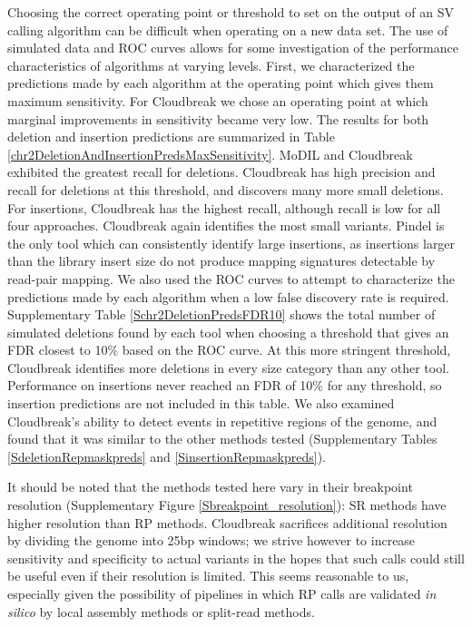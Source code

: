\documentclass[11pt]{article}
\begin{document}
Choosing the correct operating point or threshold to set on the output of an SV calling algorithm can be difficult when operating on a new data set. The use of simulated data and ROC curves allows for some investigation of the performance characteristics of algorithms at varying levels. First, we characterized the predictions made by each algorithm at the operating point which gives them maximum sensitivity. For Cloudbreak we chose an operating point at which marginal improvements in sensitivity became very low. The results for both deletion and insertion predictions are summarized in Table \ref{chr2DeletionAndInsertionPredsMaxSensitivity}. MoDIL and Cloudbreak exhibited the greatest recall for deletions. Cloudbreak has high precision and recall for deletions at this threshold, and discovers many more small deletions. For insertions, Cloudbreak has the highest recall, although recall is low for all four approaches. Cloudbreak again identifies the most small variants. Pindel is the only tool which can consistently identify large insertions, as insertions larger than the library insert size do not produce mapping signatures detectable by read-pair mapping. We also used the ROC curves to attempt to characterize the predictions made by each algorithm when a low false discovery rate is required. Supplementary Table \ref{Schr2DeletionPredsFDR10} shows the total number of simulated deletions found by each tool when choosing a threshold that gives an FDR closest to 10\% based on the ROC curve. At this more stringent threshold, Cloudbreak identifies more deletions in every size category than any other tool. Performance on insertions never reached an FDR of 10\% for any threshold, so insertion predictions are not included in this table. We also examined Cloudbreak's ability to detect events in repetitive regions of the genome, and found that it was similar to the other methods tested (Supplementary Tables \ref{SdeletionRepmaskpreds} and \ref{SinsertionRepmaskpreds}).

It should be noted that the methods tested here vary in their breakpoint resolution (Supplementary Figure \ref{Sbreakpoint_resolution}): SR methods have higher resolution than RP methods. Cloudbreak sacrifices additional resolution by dividing the genome into 25bp windows; we strive however to increase sensitivity and specificity to actual variants in the hopes that such calls could still be useful even if their resolution is limited. This seems reasonable to us, especially given the possibility of pipelines in which RP calls are validated \emph{in silico} by local assembly methods or split-read methods.
\end{document}
